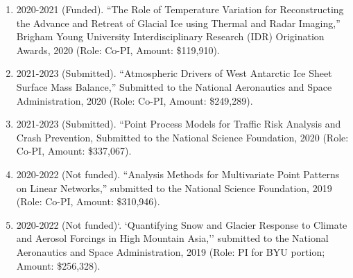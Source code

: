\documentclass[12pt]{article}
\begin{document}
\begin{enumerate}[label=$\bullet$]
\item 2020-2021 (Funded). ``The Role of Temperature Variation for Reconstructing the Advance and Retreat of Glacial Ice using Thermal and Radar Imaging,'' Brigham Young University Interdisciplinary Research (IDR) Origination Awards, 2020 (Role: Co-PI, Amount: \$119,910).
\item 2021-2023 (Submitted). ``Atmospheric Drivers of West Antarctic Ice Sheet Surface Mass Balance,'' Submitted to the National Aeronautics and Space Administration, 2020 (Role: Co-PI, Amount: \$249,289).
\item 2021-2023 (Submitted). ``Point Process Models for Traffic Risk Analysis and Crash Prevention, Submitted to the National Science Foundation, 2020 (Role: Co-PI, Amount: \$337,067).
\item 2020-2022 (Not funded). ``Analysis Methods for Multivariate Point Patterns on Linear Networks,'' submitted to the National Science Foundation, 2019 (Role: Co-PI, Amount: \$310,946).
\item 2020-2022 (Not funded)`. `Quantifying Snow and Glacier Response to Climate and Aerosol Forcings in High Mountain Asia,'' submitted to the National Aeronautics and Space Administration, 2019 (Role: PI for BYU portion; Amount: \$256,328).
\end{enumerate}
\end{document}
